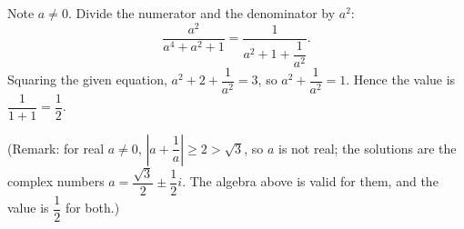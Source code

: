 Note $a\ne0$. Divide the numerator and the denominator by $a^2$:
\[
\dfrac{a^2}{a^4+a^2+1}=\dfrac{1}{a^2+1+\dfrac{1}{a^2}} .
\]
Squaring the given equation, $a^2+2+\dfrac{1}{a^2}=3$, so $a^2+\dfrac{1}{a^2}=1$. Hence the value is $\dfrac{1}{1+1}=\boxed{\dfrac{1}{2}}$.

(Remark: for real $a\ne0$, $\left|a+\dfrac{1}{a}\right|\ge2>\sqrt3$, so $a$ is not real; the solutions are the complex numbers $a=\dfrac{\sqrt3}{2}\pm\dfrac{1}{2}i$. The algebra above is valid for them, and the value is $\dfrac{1}{2}$ for both.)
